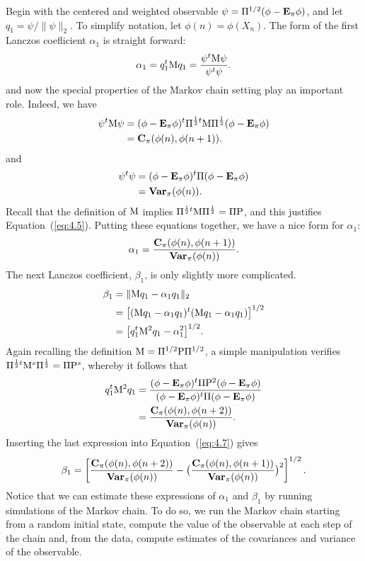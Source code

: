Begin with the centered and weighted observable 
$\psi = \Pi^{1/2} (\phi - \mathbf{E}_\pi\phi)$,
and let $q_1 = \psi/\|\psi\|_2$.
To simplify notation, let $\phi(n) = \phi(X_n)$. 
The form of the first Lanczos coeﬂicient $\alpha_1$ is straight
forward:
\[
\alpha_1 = q_1^t \mathrm{M} q_1  = \frac{\psi^t\mathrm{M}\psi}{\psi^t\psi}.
\]
and now the special properties of the Markov chain setting play an important
role. Indeed, we have
\begin{align}
\label{eq:4.5}
\psi^t\mathrm{M}\psi &= (\phi - \mathbf{E}_\pi\phi)^t\Pi^{\frac{1}{2}t}\mathrm{M}\Pi^{\frac{1}{2}}(\phi- \mathbf{E}_\pi \phi)\nonumber\\
&= \mathbf{C}_\pi (\phi(n), \phi(n + 1)).
\end{align}
and
\begin{align}
\label{eq:4.6}
\psi^t\psi &= (\phi - \mathbf{E}_\pi\phi)^t\Pi(\phi- \mathbf{E}_\pi \phi)\nonumber\\
&= \mathbf{Var}_\pi(\phi(n)).
\end{align}
Recall that the definition of $\mathrm{M}$ implies 
$\Pi^{\frac{1}{2}t}\mathrm{M}\Pi^{\frac{1}{2}}= \Pi \mathrm{P}$, and this justifies 
Equation~(\ref{eq:4.5}). Putting
%
%
%
%
these equations together, we have a nice form for $\alpha_1$:
\[
\alpha_1= \frac{\mathbf{C}_\pi (\phi(n), \phi(n + 1))}{\mathbf{Var}_\pi(\phi(n))}.
\]
The next Lanczos coefficient, $\beta_1$, is only slightly more complicated.
\begin{align}
\label{eq:4.7}
\beta_1 &= \|\mathrm{M} q_1 - \alpha_1 q_1\|_2 \nonumber\\
&= \bigl[(\mathrm{M} q_1 - \alpha_1 q_1)^t(\mathrm{M} q_1 - \alpha_1 q_1)\bigr]^{1/2}\nonumber\\
&= \bigl[q_1^t\mathrm{M}^2 q_1 - \alpha^2_1\bigr]^{1/2}.
\end{align}
Again recalling the definition $\mathrm{M} =\Pi^{1/2}\mathrm{P}\Pi^{1/2}$, a simple manipulation verifies
$\Pi^{\frac{1}{2}t}\mathrm{M}^s\Pi^{\frac{1}{2}} = \Pi \mathrm{P}^s$,
whereby it follows that
\begin{align*}
q_1^t\mathrm{M}^2 q_1  &= \frac{(\phi - \mathbf{E}_\pi\phi)^t\Pi \mathrm{P}^2(\phi- \mathbf{E}_\pi \phi)}
{(\phi - \mathbf{E}_\pi\phi)^t\Pi (\phi- \mathbf{E}_\pi \phi)} \\
&= \frac{\mathbf{C}_\pi (\phi(n), \phi(n + 2))}{\mathbf{Var}_\pi(\phi(n))}.
\end{align*}
Inserting the last expression into Equation~(\ref{eq:4.7}) gives
\[
\beta_1 = \left[\frac{\mathbf{C}_\pi (\phi(n), \phi(n + 2))}{\mathbf{Var}_\pi(\phi(n))}
-\bigl( \frac{\mathbf{C}_\pi (\phi(n), \phi(n + 1))}{\mathbf{Var}_\pi(\phi(n))}\bigr)^2
\right]^{1/2}.
\]
Notice that we can estimate these expressions of $\alpha_1$ and $\beta_1$ by
running simulations of the Markov chain. 
To do so, we run the Markov chain starting from a random initial state, compute the value of
the observable at each step of the chain and, from the data, compute estimates of the covariances
and variance of the observable.

